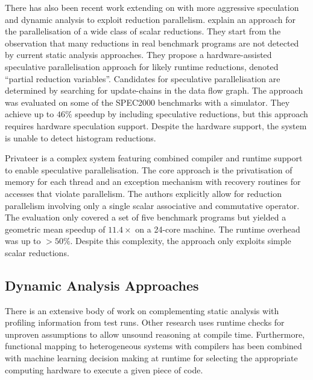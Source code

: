     There has also been recent work extending on \citet{rauchwerger1999lrpd}
    with more aggressive speculation and dynamic analysis
    \citep{aguilar2015unified} to exploit reduction parallelism.
    \citet{Han2010Speculative} explain an approach for the
    parallelisation of a wide class of scalar reductions.
    They start from the observation that many reductions in real benchmark
    programs are not detected by current static analysis approaches.
    They propose a hardware-assisted speculative parallelisation approach for
    likely runtime reductions, denoted ``partial reduction variables''.
    Candidates for speculative parallelisation are determined by searching for
    update-chains in the data flow graph.
    The approach was evaluated on some of the SPEC2000 benchmarks with a
    simulator.
    They achieve up to $46\%$ speedup by including speculative reductions, but
    this approach requires hardware speculation support.
    Despite the hardware support, the system is unable to detect histogram
    reductions.

    Privateer \citep{Johnson:2012:SSP:2254064.2254107} is a complex system
    featuring combined compiler and runtime support to enable speculative
    parallelisation.
    The core approach is the privatisation of memory for each thread and an
    exception mechanism with recovery routines for accesses that violate
    parallelism.
    The authors explicitly allow for reduction parallelism involving only a
    single scalar associative and commutative operator.
    The evaluation only covered a set of five benchmark programs but yielded
    a geometric mean speedup of $11.4\times$ on a 24-core machine.
    The runtime overhead was up to $>50\%$.
    Despite this complexity, the approach only exploits simple scalar
    reductions.

\subsection{Dynamic Analysis Approaches}

    There is an extensive body of work on complementing static analysis with
    profiling information from test runs.
    Other research uses runtime checks for unproven assumptions to allow unsound
    reasoning at compile time.
    Furthermore, functional mapping to heterogeneous systems with compilers
    has been combined with machine learning decision making at runtime for
    selecting the appropriate computing hardware to execute a given piece of
    code.

